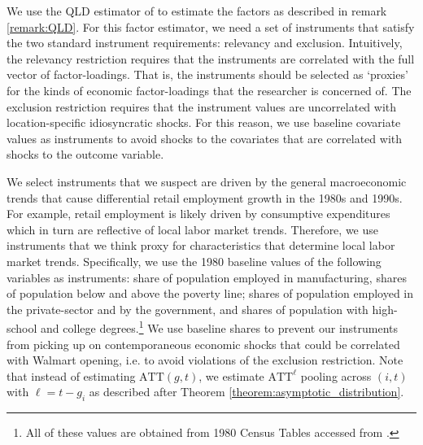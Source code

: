 \documentclass[12pt]{article}
\def\ATT{\text{ATT}}
\begin{document}
We use the QLD estimator of \citet{Ahn_Lee_Schmidt_2013} to estimate the factors as described in remark \ref{remark:QLD}. For this factor estimator, we need a set of instruments that satisfy the two standard instrument requirements: relevancy and exclusion. Intuitively, the relevancy restriction requires that the instruments are correlated with the full vector of factor-loadings. That is, the instruments should be selected as `proxies' for the kinds of economic factor-loadings that the researcher is concerned of. The exclusion restriction requires that the instrument values are uncorrelated with location-specific idiosyncratic shocks. For this reason, we use baseline covariate values as instruments to avoid shocks to the covariates that are correlated with shocks to the outcome variable. 

We select instruments that we suspect are driven by the general macroeconomic trends that cause differential retail employment growth in the 1980s and 1990s. For example, retail employment is likely driven by consumptive expenditures which in turn are reflective of local labor market trends. Therefore, we use instruments that we think proxy for characteristics that determine local labor market trends. Specifically, we use the 1980 baseline values of the following variables as instruments: share of population employed in manufacturing, shares of population below and above the poverty line; shares of population employed in the private-sector and by the government, and shares of population with high-school and college degrees.\footnote{All of these values are obtained from 1980 Census Tables accessed from \citet{manson2020ipums}.} We use baseline shares to prevent our instruments from picking up on contemporaneous economic shocks that could be correlated with Walmart opening, i.e. to avoid violations of the exclusion restriction. Note that instead of estimating $\ATT(g,t)$, we estimate $\ATT^\ell$ pooling across $(i, t)$ with $\ell = t - g_i$ as described after Theorem \ref{theorem:asymptotic_distribution}.
\end{document}
